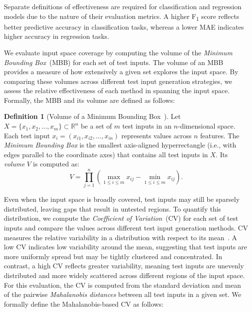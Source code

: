 \documentclass[
]{ceurart}
\theoremstyle{definition}
\newtheorem{definition}{Definition}[section]
\begin{document}
Separate definitions of effectiveness are required for classification and regression models due to the nature of their evaluation metrics. A higher F\textsubscript{1} score reflects better predictive accuracy in classification tasks, whereas a lower MAE indicates higher accuracy in regression tasks.

We evaluate input space coverage by computing the volume of the \textit{Minimum Bounding Box}~(MBB) for each set of test inputs. The volume of an MBB provides a measure of how extensively a given set explores the input space. By comparing these volumes across different test input generation strategies, we assess the relative effectiveness of each method in spanning the input space. Formally, the MBB and its volume are defined as follows:
\begin{definition}[Volume of a Minimum Bounding Box~\cite{mbb}]
\label{def:mbb}
Let $X = \{x_1, x_2, \dots, x_m\} \subset \mathbb{R}^n$ be a set of $m$ test inputs in an $n$-dimensional space. Each test input $x_i = (x_{i1}, x_{i2}, \dots, x_{in})$ represents values across $n$ features. The \textit{Minimum Bounding Box} is the smallest axis-aligned hyperrectangle (i.e., with edges parallel to the coordinate axes) that contains all test inputs in $X$. Its \textit{volume} $V$ is computed as:
\begin{equation*}
V = \prod_{j=1}^{n} \left( \max_{1 \leq i \leq m} x_{ij} - \min_{1 \leq i \leq m} x_{ij} \right).
\end{equation*}
\end{definition}

Even when the input space is broadly covered, test inputs may still be sparsely distributed, leaving gaps that result in untested regions. To quantify this distribution, we compute the \textit{Coefficient of Variation}~(CV) for each set of test inputs and compare the values across different test input generation methods. CV measures the relative variability in a distribution with respect to its mean~\cite{cv}. A low CV indicates low variability around the mean, suggesting that test inputs are more uniformly spread but may be tightly clustered and concentrated. In contrast, a high CV reflects greater variability, meaning test inputs are unevenly distributed and more widely scattered across different regions of the input space. For this evaluation, the CV is computed from the standard deviation and mean of the pairwise \textit{Mahalanobis distances} between all test inputs in a given set. We formally define the Mahalanobis-based CV as follows:
\end{document}

